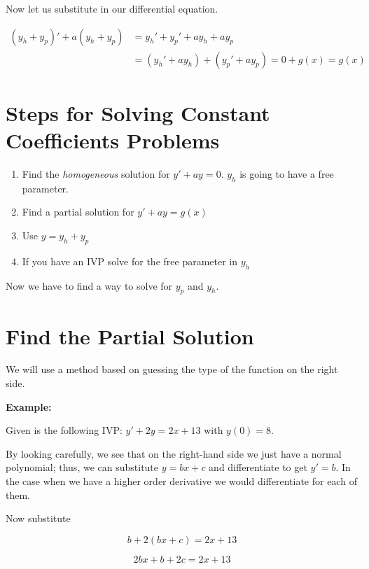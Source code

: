 Now let us substitute in our differential equation.

\begin{align*}
    (y_h + y_p)' + a(y_h + y_p) & = y_h' + y_p' + ay_h + ay_p                       \\
                                & = (y_h' + ay_h) + (y_p' + ay_p) = 0 + g(x) = g(x)
\end{align*}

\section{Steps for Solving Constant Coefficients Problems}

\begin{enumerate}

    \item Find the \emph{homogeneous} solution for \(y' + ay = 0\). \(y_h\) is going
          to have a free parameter.

    \item Find a partial solution for \(y' + ay = g(x)\)

    \item Use \(y = y_h + y_p\)

    \item If you have an IVP solve for the free parameter in \(y_h\)

\end{enumerate}

Now we have to find a way to solve for \(y_p\) and \(y_h\).

\section{Find the Partial Solution}

We will use a method based on guessing the type of the function on the right side.

\textbf{Example: }

Given is the following IVP: \(y' + 2y = 2x + 13\) with \(y(0) = 8\).

By looking carefully, we see that on the right-hand side we just have a normal polynomial;
thus, we can substitute \(y = bx + c\) and differentiate to get \(y' = b\). In the case when we have a higher
order derivative we would differentiate for each of them.

Now substitute

\[
    b + 2(bx + c) = 2x + 13
\]

\[
    2bx + b + 2c = 2x + 13
\]

